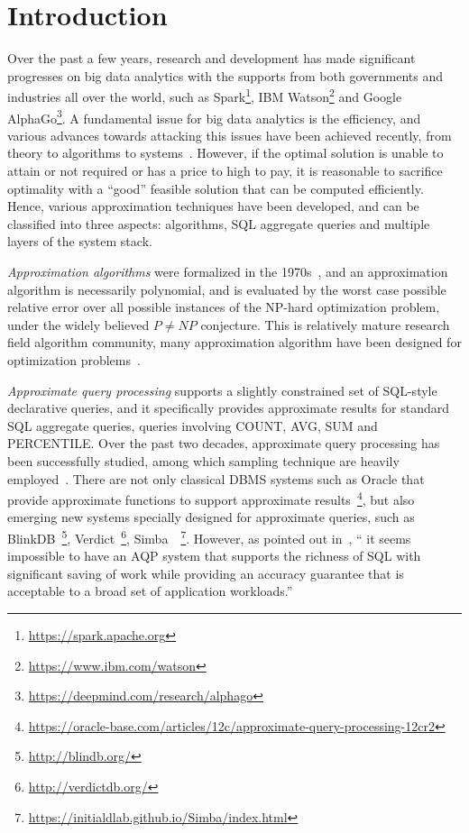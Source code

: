 \section{Introduction}
\label{sec-intro}


Over the past a few years, research and development has made significant progresses on big data analytics with the supports from both governments and industries all over the world, such as Spark\footnote{\small \url{https://spark.apache.org}}, IBM Watson\footnote{\small \url{https://www.ibm.com/watson}} and Google AlphaGo\footnote{\small \url{https://deepmind.com/research/alphago}}. A fundamental issue for big data analytics is the efficiency, and various advances towards attacking this issues have been achieved recently, from theory to algorithms to systems~\cite{FanGN13,Jordan15,ZahariaXWDADMRV16}. However, if the optimal solution is unable to attain or not required or has a price to high to pay, it is reasonable to sacrifice optimality with a ``good'' feasible solution that can be computed efficiently. Hence, various approximation techniques have been developed, and can be classified into three aspects: algorithms, SQL aggregate queries and multiple layers of the system stack.
\bi
\item[(1)] {\em Approximation algorithms} were formalized in the 1970s~\cite{GareyGU72,Johnson74a}, and an approximation algorithm is necessarily polynomial, and is evaluated by the worst case possible relative error over all possible instances of the  NP-hard optimization problem, under the widely believed $P\ne NP$ conjecture. This is relatively mature research field algorithm community, many approximation algorithm have been designed for optimization problems~\cite{Dorit96,approx03,Ausiello99}.
\item[(2)] {\em Approximate query processing} supports a slightly constrained set of SQL-style declarative queries, and it specifically provides approximate results for standard SQL aggregate queries, \eg queries involving COUNT, AVG, SUM and PERCENTILE. Over the past two decades, approximate query processing has been successfully studied, among which sampling technique are heavily employed~\cite{ChaudhuriDK17,Mozafari17,Kraska17,GarofalakisG01}. There are not only classical DBMS systems such as Oracle that provide approximate functions to support approximate results~\footnote{\small \url{https://oracle-base.com/articles/12c/approximate-query-processing-12cr2}}, but also emerging new systems specially designed for approximate queries, such as BlinkDB~\footnote{\small \url{http://blindb.org/}}, Verdict~\footnote{\small \url{http://verdictdb.org/}}, Simba~~\footnote{\small \url{https://initialdlab.github.io/Simba/index.html}}. However, as pointed out in~\cite{ChaudhuriDK17}, `` it seems impossible to have an AQP system that supports the richness of SQL with significant saving of work while providing an accuracy guarantee that is acceptable to a broad set of application workloads.''

